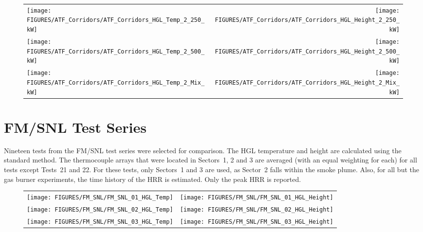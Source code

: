 \begin{figure}[p]
\begin{tabular*}{\textwidth}{l@{\extracolsep{\fill}}r}
\texttt{[image: FIGURES/ATF\_Corridors/ATF\_Corridors\_HGL\_Temp\_2\_250\_kW]} &
\texttt{[image: FIGURES/ATF\_Corridors/ATF\_Corridors\_HGL\_Height\_2\_250\_kW]} \\
\texttt{[image: FIGURES/ATF\_Corridors/ATF\_Corridors\_HGL\_Temp\_2\_500\_kW]} &
\texttt{[image: FIGURES/ATF\_Corridors/ATF\_Corridors\_HGL\_Height\_2\_500\_kW]} \\
\texttt{[image: FIGURES/ATF\_Corridors/ATF\_Corridors\_HGL\_Temp\_2\_Mix\_kW]} &
\texttt{[image: FIGURES/ATF\_Corridors/ATF\_Corridors\_HGL\_Height\_2\_Mix\_kW]}
\end{tabular*}
\end{figure}

\clearpage


\section{FM/SNL Test Series}

Nineteen tests from the FM/SNL test series were selected for comparison. The HGL temperature and height are calculated using the standard method. The thermocouple arrays that were located in Sectors~1, 2 and 3 are averaged (with an equal weighting for each) for all tests except Tests~21 and 22. For these tests, only Sectors~1 and 3 are used, as Sector~2 falls within the smoke plume. Also, for all but the gas burner experiments, the time history of the HRR is estimated. Only the peak HRR is reported.


\begin{figure}[h!]
\begin{tabular*}{\textwidth}{l@{\extracolsep{\fill}}r}
\texttt{[image: FIGURES/FM\_SNL/FM\_SNL\_01\_HGL\_Temp]} &
\texttt{[image: FIGURES/FM\_SNL/FM\_SNL\_01\_HGL\_Height]} \\
\texttt{[image: FIGURES/FM\_SNL/FM\_SNL\_02\_HGL\_Temp]} &
\texttt{[image: FIGURES/FM\_SNL/FM\_SNL\_02\_HGL\_Height]} \\
\texttt{[image: FIGURES/FM\_SNL/FM\_SNL\_03\_HGL\_Temp]} &
\texttt{[image: FIGURES/FM\_SNL/FM\_SNL\_03\_HGL\_Height]}
\end{tabular*}
\end{figure}

\newpage

